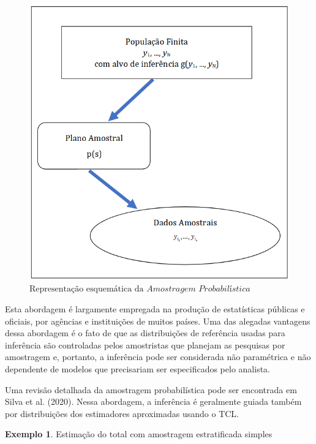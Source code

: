 \documentclass[
  12pt,
  brazilian,
]{book}
\theoremstyle{definition}
\theoremstyle{definition}
\newtheorem{example}{Exemplo}[chapter]
\theoremstyle{definition}
\theoremstyle{definition}
\theoremstyle{remark}
\begin{document}
\begin{figure}

{\centering \includegraphics{Figuras/Figura2.2} 

}

\caption{$\text{Representação esquemática da }\textit{Amostragem Probabilística}$}\label{fig:modamo}
\end{figure}

Esta abordagem é largamente empregada na produção de estatísticas públicas e
oficiais, por agências e instituições de muitos países. Uma das alegadas vantagens dessa abordagem é o fato de que as distribuições de referência usadas para inferência são controladas pelos amostristas que planejam as pesquisas por
amostragem e, portanto, a inferência pode ser considerada não paramétrica e não
dependente de modelos que precisariam ser especificados pelo analista.

Uma revisão detalhada da amostragem probabilística pode ser encontrada em Silva et al. (2020). Nessa abordagem, a inferência é geralmente guiada também por distribuições dos estimadores aproximadas usando o TCL.

\begin{example}
\protect\hypertarget{exm:aestot}{}{\label{exm:aestot} }Estimação do total com amostragem estratificada simples
\end{example}
\end{document}
